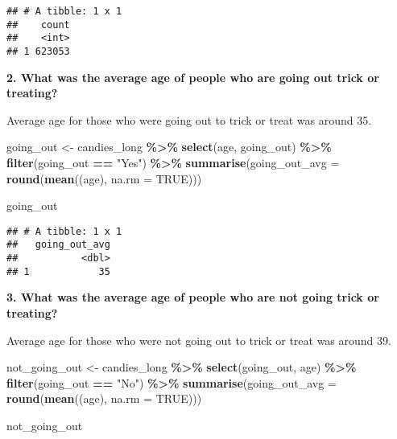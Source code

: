 \documentclass[
]{article}
\newenvironment{Shaded}{\begin{snugshade}}{\end{snugshade}}
\newcommand{\AttributeTok}[1]{\textcolor[rgb]{0.13,0.29,0.53}{#1}}
\newcommand{\ConstantTok}[1]{\textcolor[rgb]{0.56,0.35,0.01}{#1}}
\newcommand{\FunctionTok}[1]{\textcolor[rgb]{0.13,0.29,0.53}{\textbf{#1}}}
\newcommand{\NormalTok}[1]{#1}
\newcommand{\OtherTok}[1]{\textcolor[rgb]{0.56,0.35,0.01}{#1}}
\newcommand{\SpecialCharTok}[1]{\textcolor[rgb]{0.81,0.36,0.00}{\textbf{#1}}}
\newcommand{\StringTok}[1]{\textcolor[rgb]{0.31,0.60,0.02}{#1}}
\begin{document}
\begin{verbatim}
## # A tibble: 1 x 1
##    count
##    <int>
## 1 623053
\end{verbatim}

\textbf{2. What was the average age of people who are going out trick or
treating?}

Average age for those who were going out to trick or treat was around
35.

\begin{Shaded}
\begin{Highlighting}[]
\NormalTok{going\_out }\OtherTok{\textless{}{-}}\NormalTok{ candies\_long }\SpecialCharTok{\%\textgreater{}\%} 
  \FunctionTok{select}\NormalTok{(age, going\_out) }\SpecialCharTok{\%\textgreater{}\%} 
  \FunctionTok{filter}\NormalTok{(going\_out }\SpecialCharTok{==} \StringTok{"Yes"}\NormalTok{) }\SpecialCharTok{\%\textgreater{}\%} 
  \FunctionTok{summarise}\NormalTok{(}\AttributeTok{going\_out\_avg =} \FunctionTok{round}\NormalTok{(}\FunctionTok{mean}\NormalTok{((age), }\AttributeTok{na.rm =} \ConstantTok{TRUE}\NormalTok{)))}

\NormalTok{going\_out}
\end{Highlighting}
\end{Shaded}

\begin{verbatim}
## # A tibble: 1 x 1
##   going_out_avg
##           <dbl>
## 1            35
\end{verbatim}

\textbf{3. What was the average age of people who are not going trick or
treating?}

Average age for those who were not going out to trick or treat was
around 39.

\begin{Shaded}
\begin{Highlighting}[]
\NormalTok{not\_going\_out }\OtherTok{\textless{}{-}}\NormalTok{ candies\_long }\SpecialCharTok{\%\textgreater{}\%} 
  \FunctionTok{select}\NormalTok{(going\_out, age) }\SpecialCharTok{\%\textgreater{}\%} 
  \FunctionTok{filter}\NormalTok{(going\_out }\SpecialCharTok{==} \StringTok{"No"}\NormalTok{) }\SpecialCharTok{\%\textgreater{}\%} 
  \FunctionTok{summarise}\NormalTok{(}\AttributeTok{going\_out\_avg =} \FunctionTok{round}\NormalTok{(}\FunctionTok{mean}\NormalTok{((age), }\AttributeTok{na.rm =} \ConstantTok{TRUE}\NormalTok{)))}

\NormalTok{not\_going\_out}
\end{Highlighting}
\end{Shaded}
\end{document}
